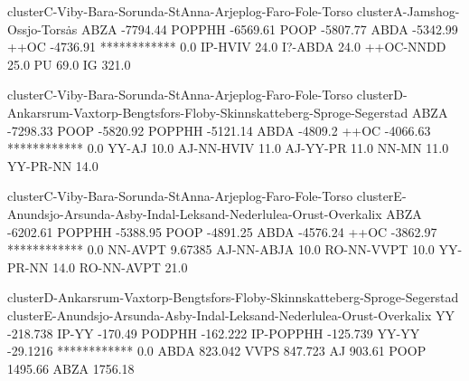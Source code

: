 clusterC-Viby-Bara-Sorunda-StAnna-Arjeplog-Faro-Fole-Torso
clusterA-Jamshog-Ossjo-Tors\.as
ABZA -7794.44
POPPHH -6569.61
POOP -5807.77
ABDA -5342.99
++OC -4736.91
************ 0.0
IP-HVIV 24.0
I?-ABDA 24.0
++OC-NNDD 25.0
PU 69.0
IG 321.0

clusterC-Viby-Bara-Sorunda-StAnna-Arjeplog-Faro-Fole-Torso
clusterD-Ankarsrum-Vaxtorp-Bengtsfors-Floby-Skinnskatteberg-Sproge-Segerstad
ABZA -7298.33
POOP -5820.92
POPPHH -5121.14
ABDA -4809.2
++OC -4066.63
************ 0.0
YY-AJ 10.0
AJ-NN-HVIV 11.0
AJ-YY-PR 11.0
NN-MN 11.0
YY-PR-NN 14.0

clusterC-Viby-Bara-Sorunda-StAnna-Arjeplog-Faro-Fole-Torso
clusterE-Anundsjo-Arsunda-Asby-Indal-Leksand-Nederlulea-Orust-Overkalix
ABZA -6202.61
POPPHH -5388.95
POOP -4891.25
ABDA -4576.24
++OC -3862.97
************ 0.0
NN-AVPT 9.67385
AJ-NN-ABJA 10.0
RO-NN-VVPT 10.0
YY-PR-NN 14.0
RO-NN-AVPT 21.0

clusterD-Ankarsrum-Vaxtorp-Bengtsfors-Floby-Skinnskatteberg-Sproge-Segerstad
clusterE-Anundsjo-Arsunda-Asby-Indal-Leksand-Nederlulea-Orust-Overkalix
YY -218.738
IP-YY -170.49
PODPHH -162.222
IP-POPPHH -125.739
YY-YY -29.1216
************ 0.0
ABDA 823.042
VVPS 847.723
AJ 903.61
POOP 1495.66
ABZA 1756.18
